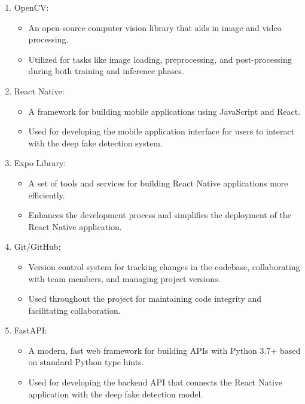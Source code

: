 \begin{enumerate}
        \item OpenCV:
            \begin{itemize}
                \item An open-source computer vision library that aids in image and video processing.
                \item Utilized for tasks like image loading, preprocessing, and post-processing during both training and inference phases.
            \end{itemize}
        
        \item React Native:
            \begin{itemize}
                \item A framework for building mobile applications using JavaScript and React.
                \item Used for developing the mobile application interface for users to interact with the deep fake detection system.
            \end{itemize}
        
        \item Expo Library:
            \begin{itemize}
                \item A set of tools and services for building React Native applications more efficiently.
                \item Enhances the development process and simplifies the deployment of the React Native application.
            \end{itemize}
        
        \item Git/GitHub:
            \begin{itemize}
                \item Version control system for tracking changes in the codebase, collaborating with team members, and managing project versions.
                \item Used throughout the project for maintaining code integrity and facilitating collaboration.
            \end{itemize}
        
        \item FastAPI:
            \begin{itemize}
                \item A modern, fast web framework for building APIs with Python 3.7+ based on standard Python type hints.
                \item Used for developing the backend API that connects the React Native application with the deep fake detection model.
            \end{itemize}
    
\end{enumerate}
\newpage